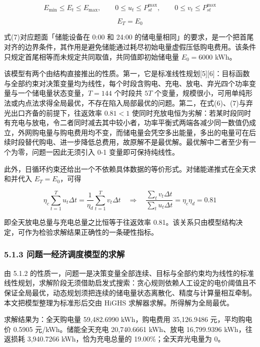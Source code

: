 \documentclass[12pt,a4paper]{ctexart}
\begin{document}
\begin{equation}
E_{\min}\le E_t\le E_{\max},\qquad 0\le u_t\le P_{st}^{\max},\qquad 0\le v_t\le P_{st}^{\max}
\end{equation}

\begin{equation}
E_T=E_0
\end{equation}

式(7)对应题面「储能设备在 0:00 和 24:00 的储电量相同」的要求，是一个把首尾对齐的边界条件，其作用是避免储能通过耗尽初始电量虚假压低购电费用。该条件只规定首尾相等而未规定共同取值，共同值即初始储电量 $E_0=6000$ kWh。

该模型有两个由结构直接推出的性质。第一，它是标准线性规划[5][6]：目标函数与全部约束对决策变量均为线性，每个时段含购电、充电、放电、弃光四个功率变量与一个储电量状态变量，$T=144$ 个时段共 $5T$ 个变量，规模很小，可用单纯形法或内点法求得全局最优，不存在陷入局部最优的问题。第二，在式(6)、(7)与弃光出口齐备的前提下，往返效率 $0.81<1$ 使同时充放电恒为劣解：若某时段同时有充电与放电，令二者同时减去其中较小者，功率平衡式两端各减少同一数值仍成立，外网购电量与购电费用均不变，而储电量会凭空多出能量，多出的电量可在后续时段替代购电、进一步降低总费用，故原解不是最优解。最优解中二者至少有一个为零，问题一因此无须引入 0-1 变量即可保持纯线性。

此外，日循环约束还给出一个不依赖具体数据的等价形式。对储能递推式在全天求和并代入 $E_T=E_0$，可得

\begin{equation}
\eta_c\sum_{t=1}^{T}u_t \Delta t=\frac{1}{\eta_d}\sum_{t=1}^{T}v_t \Delta t \quad\Longrightarrow\quad \frac{\sum_{t}v_t \Delta t}{\sum_{t}u_t \Delta t}=\eta_c\eta_d=0.81
\end{equation}

即全天放电总量与充电总量之比恒等于往返效率 0.81。该关系只由模型结构决定，可作为检验求解结果正确性的一条硬性指标。

\subsubsection*{5.1.3 问题一经济调度模型的求解}

由 5.1.2 的性质一，问题一是决策变量全部连续、目标与全部约束均为线性的标准线性规划，求解阶段无须借助启发式搜索：贪心规则依赖人工设定的电价阈值且不保证全局最优，动态规划须把连续的储电量状态离散化、精度与计算量相互牵制。本文把模型整理为标准形后交由 HiGHS 求解器求解。所得解为全局最优。

求解结果为：全天购电量 59,482.6990 kWh，购电费用 35,126.9486 元，平均购电价 0.5905 元/kWh。储能全天充电 20,740.6661 kWh、放电 16,799.9396 kWh，往返损耗 3,940.7266 kWh，恰为充电总量的 19.00\%；全天弃光电量为 0。
\end{document}
